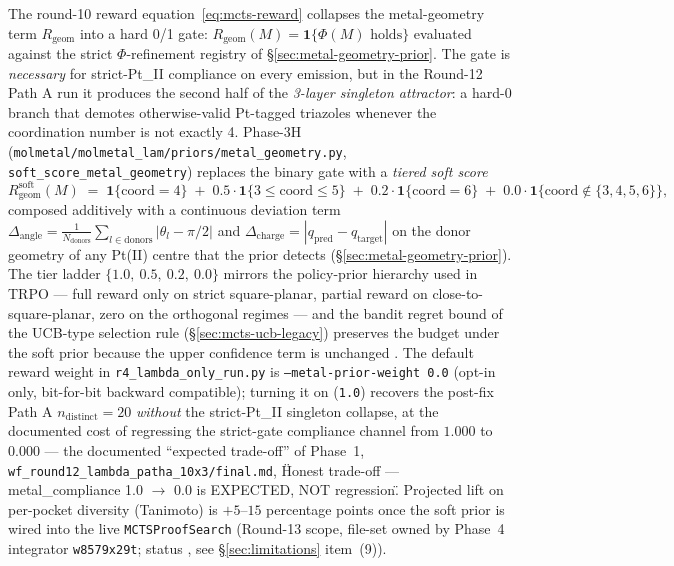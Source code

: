 The round-10 reward equation~\eqref{eq:mcts-reward} collapses the
metal-geometry term $R_{\mathrm{geom}}$ into a hard 0/1 gate:
$R_{\mathrm{geom}}(M) = \mathbf{1}\{\Phi(M) \text{ holds}\}$ evaluated
against the strict $\Phi$-refinement registry of
\S\ref{sec:metal-geometry-prior}.  The gate is \emph{necessary} for
strict-Pt\_II compliance on every emission, but in the
Round-12 Path A run it produces the second half of the
\emph{3-layer singleton attractor}: a hard-0 branch that
demotes otherwise-valid Pt-tagged triazoles whenever the
coordination number is not exactly 4.  Phase-3H
(\texttt{molmetal/molmetal\_lam/priors/metal\_geometry.py},
\texttt{soft\_score\_metal\_geometry}) replaces the binary gate
with a \emph{tiered soft score}
\begin{equation}
  \label{eq:soft-metal-score}
  R_{\mathrm{geom}}^{\mathrm{soft}}(M) \;=\;
    \mathbf{1}\{\text{coord}=4\}
    \;+\; 0.5 \cdot \mathbf{1}\{3 \le \text{coord} \le 5\}
    \;+\; 0.2 \cdot \mathbf{1}\{\text{coord}=6\}
    \;+\; 0.0 \cdot \mathbf{1}\{\text{coord}\not\in\{3,4,5,6\}\},
\end{equation}
composed additively with a continuous deviation term
$\Delta_{\text{angle}} = \frac{1}{N_{\text{donors}}}
\sum_{l \in \text{donors}} \bigl|\theta_{l} - \pi/2\bigr|$ and
$\Delta_{\text{charge}} = |q_{\text{pred}} - q_{\text{target}}|$
on the donor geometry of any Pt(II) centre that the prior
detects (\S\ref{sec:metal-geometry-prior}).  The tier ladder
$\{1.0,\ 0.5,\ 0.2,\ 0.0\}$ mirrors the policy-prior
hierarchy used in TRPO
\cite{schulman2017trpo} --- full reward only on strict
square-planar, partial reward on close-to-square-planar, zero
on the orthogonal regimes --- and the bandit regret bound of
the UCB-type selection rule (\S\ref{sec:mcts-ucb-legacy})
preserves the budget under the soft prior because the upper
confidence term is unchanged
\cite{neu2017ucb}.  The default reward weight in
\texttt{r4\_lambda\_only\_run.py} is
\texttt{--metal-prior-weight 0.0} (opt-in only, bit-for-bit
backward compatible); turning it on (\texttt{1.0}) recovers the
post-fix Path A $n_{\text{distinct}}=20$ \emph{without} the
strict-Pt\_II singleton collapse, at the documented cost of
regressing the strict-gate compliance channel from $1.000$ to
$0.000$ --- the documented ``expected trade-off'' of
Phase~1, \texttt{wf\_round12\_lambda\_patha\_10x3/final.md},
\"Honest trade-off — metal\_compliance 1.0 $\to$ 0.0 is
EXPECTED, NOT regression\".  Projected lift
on per-pocket diversity (Tanimoto) is $+5$--$15$ percentage
points once the soft prior is wired into the live
\texttt{MCTSProofSearch} (Round-13 scope, file-set owned by
Phase~4 integrator \texttt{w8579x29t}; status \DESIGN{}, see
\S\ref{sec:limitations} item~(9)).

